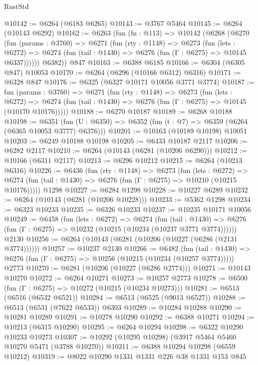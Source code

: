 \begin{lexlean}{RustStd}
\begin{coremodule}
@10142 := @6264 (@6183 @6265)
@10143 := @3767 @5464
@10145 := @6264 (@10143 @6292)
@10162 := @6263
    (fun (fn : @113) =>
    @10142
      (@6268
        (@6270
          (fun (params : @3760) =>
          @6271
            (fun (rty : @1148) =>
            @6273
              (fun (lets : @6272) =>
              @6274 (fun (tail : @1430) => @6276 (fun (Γ : @6275) => @10145 @6337))))))
        @6382))
    @847
@10163 := @6388 @6185
@10166 := @6304 (@6305 @847) @10053
@10170 := @6264 (@6296 (@10166 @6312) @6316)
@10171 := @6328 @847
@10176 := @6325 (@6327 @10171 @10056 @3771 @3774)
@10187 := fun (params : @3760) =>
  @6271
    (fun (rty : @1148) =>
    @6273
      (fun (lets : @6272) =>
      @6274 (fun (tail : @1430) => @6276 (fun (Γ : @6275) => @10145 (@10170 @10176)))))
@10188 := @6270 @10187
@10189 := @6268 @10188
@10198 := @6351
    (fun (U : @6350) => @6352 (fun (t : @7) => @6359 (@6264 (@6365 @10053 @3777) @6376)))
@10201 := @10163 (@10189 @10198) @10051
@10203 := @6249 @10188 @10198
@10205 := @6433 @10187 @2117
@10206 := @6282 @2117
@10210 := @6264 (@10143 (@6281 (@10206 @6290)))
@10212 := @10166 (@6311 @2117)
@10213 := @6296 @10212
@10215 := @6264 (@10213 @6316)
@10226 := @6436
    (fun (rty : @1148) =>
    @6273
      (fun (lets : @6272) =>
      @6274 (fun (tail : @1430) => @6276 (fun (Γ : @6275) => @10210 (@10215 @10176)))))
    @1298
@10227 := @6284 @1298
@10228 := @10227 @6289
@10232 := @6264 (@10143 (@6281 (@10206 @10228)))
@10233 := @5362 @1298
@10234 := @6323 @10233
@10235 := @6326 @10233
@10237 := @10235 @10171 @10056
@10249 := @6458
    (fun (lets : @6272) =>
    @6274
      (fun (tail : @1430) =>
      @6276 (fun (Γ : @6275) => @10232 (@10215 (@10234 (@10237 @3771 @3774))))))
    @2130
@10256 := @6264 (@10143 (@6281 (@10206 (@10227 (@6286 (@2131 @3774))))))
@10257 := @10237 @2130
@10266 := @6482
    (fun (tail : @1430) => @6276 (fun (Γ : @6275) => @10256 (@10215 (@10234 (@10257 @3774)))))
    @2773
@10270 := @6281 (@10206 (@10227 (@6286 @2774)))
@10271 := @10143 @10270
@10272 := @6264 @10271
@10273 := @10257 @2773
@10278 := @6500 (fun (Γ : @6275) => @10272 (@10215 (@10234 @10273)))
@10281 := @6513 (@6516 (@6532 @6521))
@10284 := @6513 (@6525 (@9013 @6527))
@10288 := @6513 (@6531 (@7622 @6533)) @6303
@10289 := @10284 @10288
@10290 := @10281 @10289
@10291 := @10278 @10290
@10292 := @6388 @10271
@10294 := @10213 (@6315 @10290)
@10295 := @6264 @10294
@10298 := @6322 @10290 @10233 @10273
@10307 := @10292 (@10295 @10298) (@3917 @5464 @5460 @10270 @5471 (@3788 @10270))
@10311 := @6388 @10294 @10298 (@6559 @10212)
@10319 := @8022 @10290 @1331 @1331 @226 @38 @1331 @153 @845

\end{coremodule}
\end{lexlean}
